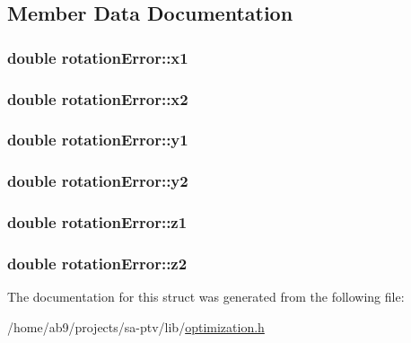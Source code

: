 \subsection{Member Data Documentation}
\hypertarget{structrotationError_a9415ed45ed91f063e52f29ce11b61273}{
\subsubsection[{x1}]{\setlength{\rightskip}{0pt plus 5cm}double rotation\-Error\-::x1}}\label{dd/d4e/structrotationError_a9415ed45ed91f063e52f29ce11b61273}
\hypertarget{structrotationError_ac15987a3eeed2caea868782d96446b41}{
\subsubsection[{x2}]{\setlength{\rightskip}{0pt plus 5cm}double rotation\-Error\-::x2}}\label{dd/d4e/structrotationError_ac15987a3eeed2caea868782d96446b41}
\hypertarget{structrotationError_af3636f2f2ee2e540f190eaabe268358a}{
\subsubsection[{y1}]{\setlength{\rightskip}{0pt plus 5cm}double rotation\-Error\-::y1}}\label{dd/d4e/structrotationError_af3636f2f2ee2e540f190eaabe268358a}
\hypertarget{structrotationError_aef6cabe438fbe705ae5d26c96caf73f4}{
\subsubsection[{y2}]{\setlength{\rightskip}{0pt plus 5cm}double rotation\-Error\-::y2}}\label{dd/d4e/structrotationError_aef6cabe438fbe705ae5d26c96caf73f4}
\hypertarget{structrotationError_aef6f024e5632102285d2214ebf86a5d7}{
\subsubsection[{z1}]{\setlength{\rightskip}{0pt plus 5cm}double rotation\-Error\-::z1}}\label{dd/d4e/structrotationError_aef6f024e5632102285d2214ebf86a5d7}
\hypertarget{structrotationError_af6db1bdce5eb86f310b3d3be803c7e40}{
\subsubsection[{z2}]{\setlength{\rightskip}{0pt plus 5cm}double rotation\-Error\-::z2}}\label{dd/d4e/structrotationError_af6db1bdce5eb86f310b3d3be803c7e40}


The documentation for this struct was generated from the following file\-:\begin{DoxyCompactItemize}
\item 
/home/ab9/projects/sa-\/ptv/lib/\hyperlink{optimization_8h}{optimization.\-h}\end{DoxyCompactItemize}
